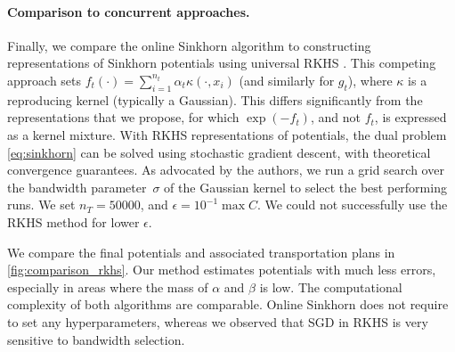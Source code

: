 \paragraph{Comparison to concurrent approaches.}\label{sec:compare}Finally, we compare the online
Sinkhorn algorithm to constructing representations of Sinkhorn potentials using universal
RKHS \citep{2016-genevay-nips}. This competing approach sets $f_t(\cdot) =
\sum_{i=1}^{n_t} \alpha_t \kappa(\cdot, x_i)$ (and similarly for $g_t$), where $\kappa$ is
a reproducing kernel (typically a Gaussian). This differs significantly from the
representations that we propose, for which $\exp(-f_t)$, and not $f_t$, is
expressed as a kernel mixture. 
%
With RKHS representations of potentials, the
dual problem \eqref{eq:sinkhorn} can be solved using stochastic gradient
descent, with theoretical convergence guarantees. As advocated by the authors,
we run a grid search over the bandwidth parameter~$\sigma$ of the Gaussian kernel to select the best
performing runs. We set $n_T = 50000$, and $\epsilon = 10^{-1} \max C$. We could not successfully use the RKHS method for lower $\epsilon$.

We compare the final potentials and associated transportation plans in
\autoref{fig:comparison_rkhs}. Our method estimates potentials with much less
errors, especially in areas where the mass of $\alpha$ and $\beta$ is low. The
computational complexity of both algorithms are comparable. Online Sinkhorn does
not require to set any hyperparameters, whereas we observed that SGD in RKHS is very
sensitive to bandwidth selection.

